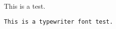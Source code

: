 \documentclass{article}
\begin{document}
This is a test.

\texttt{This is a typewriter font test.}
\end{document}
